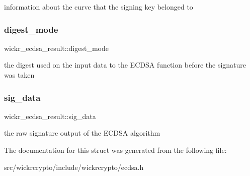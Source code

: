 information about the curve that the signing key belonged to \mbox{\label{structwickr__ecdsa__result_a33c820900693a016ac43702e76b54cff}} 
\subsubsection{\texorpdfstring{digest\+\_\+mode}{digest\_mode}}
{\footnotesize\ttfamily wickr\+\_\+ecdsa\+\_\+result\+::digest\+\_\+mode}

the digest used on the input data to the E\+C\+D\+SA function before the signature was taken \mbox{\label{structwickr__ecdsa__result_ada32a17d9f713f84142fc6a338ebcc48}} 
\subsubsection{\texorpdfstring{sig\+\_\+data}{sig\_data}}
{\footnotesize\ttfamily wickr\+\_\+ecdsa\+\_\+result\+::sig\+\_\+data}

the raw signature output of the E\+C\+D\+SA algorithm 

The documentation for this struct was generated from the following file\+:\begin{DoxyCompactItemize}
\item 
src/wickrcrypto/include/wickrcrypto/ecdsa.\+h\end{DoxyCompactItemize}
